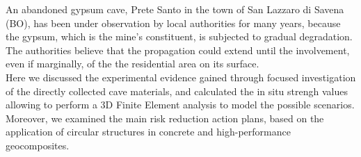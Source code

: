An abandoned gypsum cave, Prete Santo in the town of San Lazzaro di Savena (BO), has been under observation by local authorities for many years, because the gypsum, which is the mine's constituent, is subjected to gradual degradation.\\
The authorities believe that the propagation could extend until the involvement, even if marginally, of the the residential area on its surface.\\
Here we discussed the experimental evidence gained through focused investigation of the directly collected cave materials, and calculated
the in situ strengh values allowing to perform a 3D Finite Element analysis to model the possible scenarios.\\
Moreover, we examined the main risk reduction action plans, based on the application of circular structures in concrete and
high-performance geocomposites.


\endgroup			

\vfill

%
